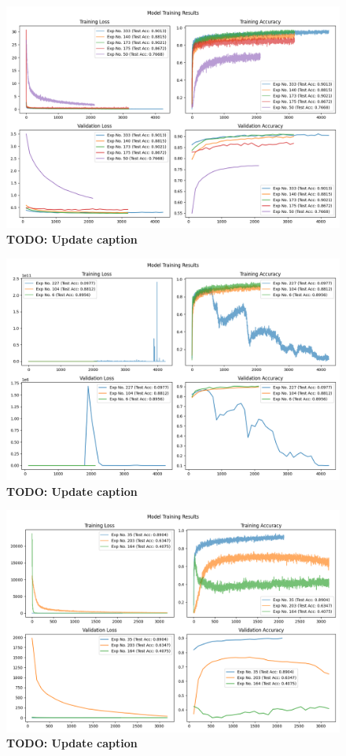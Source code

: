 \documentclass[11pt]{amsart}
\begin{document}
\begin{figure}[h]
	\centering
	\includegraphics[width=.9\textwidth]{../visualizations/model_training_results_vis_0.png}
 	\caption{\textbf{TODO: Update caption}}\label{fig:f1}
\end{figure}

\begin{figure}[h]
	\centering
	\includegraphics[width=.9\textwidth]{../visualizations/model_training_results_vis_1.png}
 	\caption{\textbf{TODO: Update caption}}\label{fig:f2}
\end{figure}

\begin{figure}[h]
	\centering
	\includegraphics[width=.9\textwidth]{../visualizations/model_training_results_vis_2.png}
 	\caption{\textbf{TODO: Update caption}}\label{fig:f3}
\end{figure}
\end{document}
